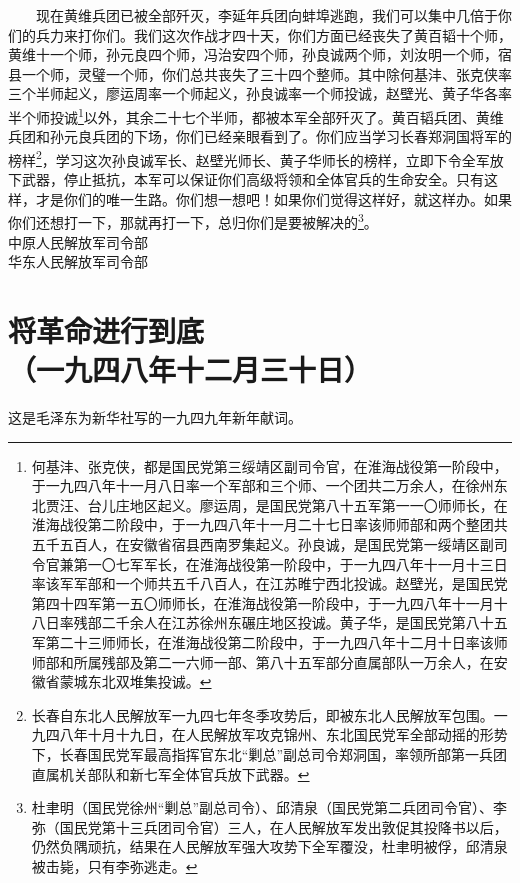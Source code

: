 \documentclass[cn,11pt,chinese]{elegantbook}
\def\myformat#1{\hfil\hfil #1}
\begin{document}
　　现在黄维兵团已被全部歼灭，李延年兵团向蚌埠逃跑，我们可以集中几倍于你们的兵力来打你们。我们这次作战才四十天，你们方面已经丧失了黄百韬十个师，黄维十一个师，孙元良四个师，冯治安四个师，孙良诚两个师，刘汝明一个师，宿县一个师，灵璧一个师，你们总共丧失了三十四个整师。其中除何基沣、张克侠率三个半师起义，廖运周率一个师起义，孙良诚率一个师投诚，赵壁光、黄子华各率半个师投诚\footnote[1]{ 何基沣、张克侠，都是国民党第三绥靖区副司令官，在淮海战役第一阶段中，于一九四八年十一月八日率一个军部和三个师、一个团共二万余人，在徐州东北贾汪、台儿庄地区起义。廖运周，是国民党第八十五军第一一〇师师长，在淮海战役第二阶段中，于一九四八年十一月二十七日率该师师部和两个整团共五千五百人，在安徽省宿县西南罗集起义。孙良诚，是国民党第一绥靖区副司令官兼第一〇七军军长，在淮海战役第一阶段中，于一九四八年十一月十三日率该军军部和一个师共五千八百人，在江苏睢宁西北投诚。赵壁光，是国民党第四十四军第一五〇师师长，在淮海战役第一阶段中，于一九四八年十一月十八日率残部二千余人在江苏徐州东碾庄地区投诚。黄子华，是国民党第八十五军第二十三师师长，在淮海战役第二阶段中，于一九四八年十二月十日率该师师部和所属残部及第二一六师一部、第八十五军部分直属部队一万余人，在安徽省蒙城东北双堆集投诚。}以外，其余二十七个半师，都被本军全部歼灭了。黄百韬兵团、黄维兵团和孙元良兵团的下场，你们已经亲眼看到了。你们应当学习长春郑洞国将军的榜样\footnote[2]{ 长春自东北人民解放军一九四七年冬季攻势后，即被东北人民解放军包围。一九四八年十月十九日，在人民解放军攻克锦州、东北国民党军全部动摇的形势下，长春国民党军最高指挥官东北“剿总”副总司令郑洞国，率领所部第一兵团直属机关部队和新七军全体官兵放下武器。}，学习这次孙良诚军长、赵壁光师长、黄子华师长的榜样，立即下令全军放下武器，停止抵抗，本军可以保证你们高级将领和全体官兵的生命安全。只有这样，才是你们的唯一生路。你们想一想吧！如果你们觉得这样好，就这样办。如果你们还想打一下，那就再打一下，总归你们是要被解决的\footnote[3]{ 杜聿明（国民党徐州“剿总”副总司令）、邱清泉（国民党第二兵团司令官）、李弥（国民党第十三兵团司令官）三人，在人民解放军发出敦促其投降书以后，仍然负隅顽抗，结果在人民解放军强大攻势下全军覆没，杜聿明被俘，邱清泉被击毙，只有李弥逃走。}。\\
中原人民解放军司令部\\
华东人民解放军司令部\\
\newpage\section*{\myformat{将革命进行到底}\\\myformat{（一九四八年十二月三十日）}}
\begin{introduction}\item  这是毛泽东为新华社写的一九四九年新年献词。\end{introduction}
\end{document}
